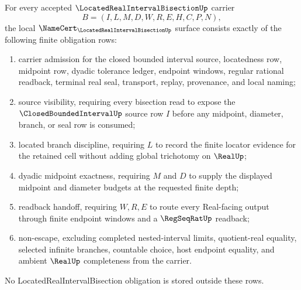 \begin{theorem}
\label{thm:located-real-interval-bisection-obligation-surface}
For every accepted $\LocatedRealIntervalBisectionUp$ carrier
$$
B=(I,L,M,D,W,R,E,H,C,P,N),
$$
the local $\NameCert_{\LocatedRealIntervalBisectionUp}$ surface consists exactly of the following finite obligation rows:
\begin{enumerate}
\item carrier admission for the closed bounded interval source, locatedness row, midpoint row, dyadic tolerance ledger, endpoint windows, regular rational readback, terminal real seal, transport, replay, provenance, and local naming;
\item source visibility, requiring every bisection read to expose the $\ClosedBoundedIntervalUp$ source row $I$ before any midpoint, diameter, branch, or seal row is consumed;
\item located branch discipline, requiring $L$ to record the finite locator evidence for the retained cell without adding global trichotomy on $\RealUp$;
\item dyadic midpoint exactness, requiring $M$ and $D$ to supply the displayed midpoint and diameter budgets at the requested finite depth;
\item readback handoff, requiring $W,R,E$ to route every Real-facing output through finite endpoint windows and a $\RegSeqRatUp$ readback;
\item non-escape, excluding completed nested-interval limits, quotient-real equality, selected infinite branches, countable choice, host endpoint equality, and ambient $\RealUp$ completeness from the carrier.
\end{enumerate}
No LocatedRealIntervalBisection obligation is stored outside these rows.
\end{theorem}
